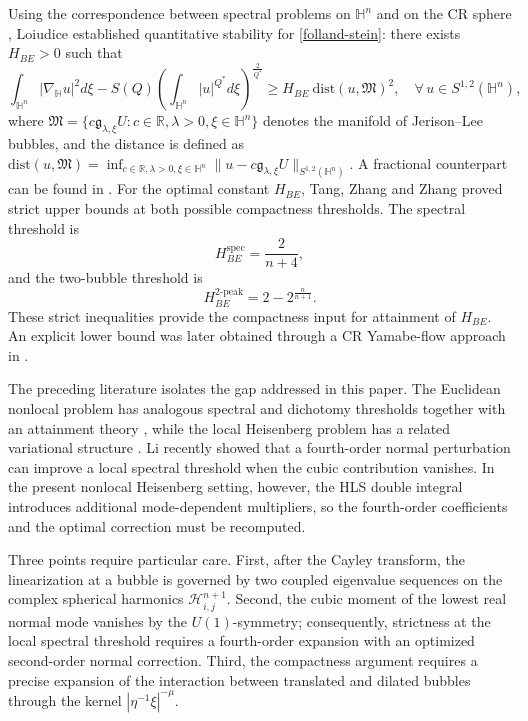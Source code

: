 \documentclass[10pt,a4paper]{amsart}
\begin{document}
{Using the correspondence between spectral problems on $\mathbb{H}^{n}$ and on the CR sphere \cite{MU02}, Loiudice \cite{L05} established quantitative stability for \eqref{folland-stein}: there exists $H_{BE}>0$ such that}
\begin{equation*}
 \int_{\mathbb{H}^{n}}|\nabla_{\mathbb{H}}u|^{2}{d}\xi- S(Q)\left(\int_{\mathbb{H}^{n}}|u|^{Q^{\ast}}{d}\xi\right)^{\frac{2}{Q^{\ast}}}\geq H_{BE} ~ \mathrm{dist}(u,\mathfrak{M})^2,\quad \forall \, u\in S^{1,2}(\mathbb{H}^{n}),
\end{equation*}
 where $\mathfrak{M}=\big\{c\mathfrak{g}_{\lambda,\xi}U: c\in \mathbb{R},\lambda>0,\xi\in \mathbb{H}^n\big\}$ denotes the manifold of Jerison--Lee bubbles, and the distance is defined as $\mathrm{dist}(u,\mathfrak{M})=\inf_{c\in \mathbb{R},\lambda>0,\xi\in \mathbb{H}^n}\|u-c\mathfrak{g}_{\lambda,\xi}U\|_{S^{1,2}(\mathbb{H}^{n})}$.
 A fractional counterpart can be found in \cite{LZ15}. {For the optimal constant $H_{BE}$, Tang, Zhang and Zhang \cite{TZZ24} proved strict upper bounds at both possible compactness thresholds. The spectral threshold is}
\begin{equation*}
 H_{BE}^{\mathrm{spec}}=\frac{2}{n+4},
\end{equation*}
{and the two-bubble threshold is}
\begin{equation*}
 H_{BE}^{2\text{-peak}}=2-2^{\frac{n}{n+1}}.
\end{equation*}
{These strict inequalities provide the compactness input for attainment of $H_{BE}$. An explicit lower bound was later obtained through a CR Yamabe-flow approach in \cite{CLTW25}.}

\begingroup
The preceding literature isolates the gap addressed in this paper. The Euclidean nonlocal problem has analogous spectral and dichotomy thresholds together with an attainment theory \cite{DT25,Z26}, while the local Heisenberg problem has a related variational structure \cite{TZZ24}. Li \cite{Li26} recently showed that a fourth-order normal perturbation can improve a local spectral threshold when the cubic contribution vanishes. In the present nonlocal Heisenberg setting, however, the HLS double integral introduces additional mode-dependent multipliers, so the fourth-order coefficients and the optimal correction must be recomputed.

Three points require particular care. First, after the Cayley transform, the linearization at a bubble is governed by two coupled eigenvalue sequences on the complex spherical harmonics $\mathcal H_{i,j}^{n+1}$. Second, the cubic moment of the lowest real normal mode vanishes by the $U(1)$-symmetry; consequently, strictness at the local spectral threshold requires a fourth-order expansion with an optimized second-order normal correction. Third, the compactness argument requires a precise expansion of the interaction between translated and dilated bubbles through the kernel $|\eta^{-1}\xi|^{-\mu}$.
\end{document}
